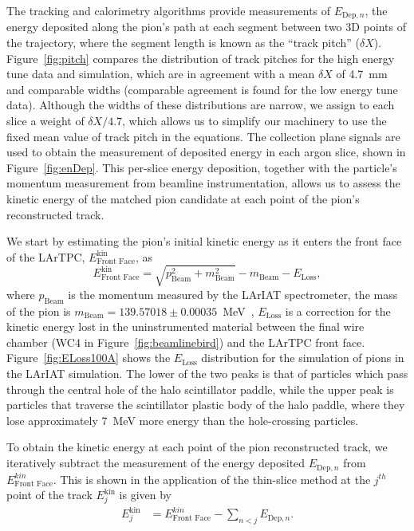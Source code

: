 \documentclass[%
 floatfix,
 reprint,
 twocolumn,
superscriptaddress,
showpacs,preprintnumbers,
 amsmath,amssymb,
 aps,
prd,
]{revtex4-1}
\begin{document}
The tracking and calorimetry algorithms provide measurements of $E_{\text{Dep},n}$, the energy deposited along the pion's path at each segment between two 3D points of the trajectory, where the segment length is known as the ``track pitch'' ($\delta X$). Figure~\ref{fig:pitch} compares the distribution of track pitches for the high energy tune data and simulation, which are in agreement with a mean $\delta X$ of 4.7~mm and comparable widths (comparable agreement is found for the low energy tune data). Although the widths of these distributions are narrow, we assign to each slice a weight of ${\delta X}/{4.7}$, which allows us to simplify our machinery to use the fixed mean value of track pitch in the equations. The collection plane signals are used to obtain the measurement of deposited energy in each argon slice, shown in Figure~\ref{fig:enDep}. This per-slice energy deposition, together with the particle's momentum measurement from beamline instrumentation, allows us to assess the kinetic energy of the matched pion candidate at each point of the pion's reconstructed track. 


We start by estimating the pion's initial  kinetic energy as it enters the front face of the LArTPC, $ E^\text{kin}_{\text{Front Face}}$, as 
\begin{equation}
 E^\text{kin}_{\text{Front Face}}  =  \sqrt{p^2_{\text{Beam}} + m^2_{\text{Beam}}} - m_{\text{Beam}} - E_{\text{Loss}},
\label{eq:enFF}
\end{equation}
where $p_{\text{Beam}}$ is the momentum measured by the LArIAT spectrometer, the mass of the pion is $m_{\text{Beam}} = 139.57018\pm0.00035$~MeV~\cite{Patrignani:2016xqp}, $E_{\text{Loss}}$ is a correction for the kinetic energy lost in the uninstrumented material between the final wire chamber (WC4 in Figure~\ref{fig:beamlinebird}) and the LArTPC front face. Figure~\ref{fig:ELoss100A} shows the $E_{\text{Loss}}$ distribution for the simulation of pions in the LArIAT simulation. The lower of the two peaks is that of particles which pass through the central hole of the halo scintillator paddle, while the upper peak is particles that traverse the scintillator plastic body of the halo paddle, where they lose approximately 7~MeV more energy than the hole-crossing particles.

To obtain the kinetic energy at each point of the pion reconstructed track, we iteratively subtract the measurement of the energy deposited $E_{\text{Dep},n}$ from $ E^{kin}_{\text{Front Face}}$. This is shown in the application of the thin-slice method at the $j^{th}$ point of the track  $E_{j}^\text{kin}$ is given by
\begin{equation}
\begin{split}
 E_{j}^\text{kin}  & = E^{kin}_{\text{Front Face}} -  \sum_{n < j} E_{\text{Dep},n}.
\end{split}
\label{eq:KEj2}
\end{equation}
\end{document}
